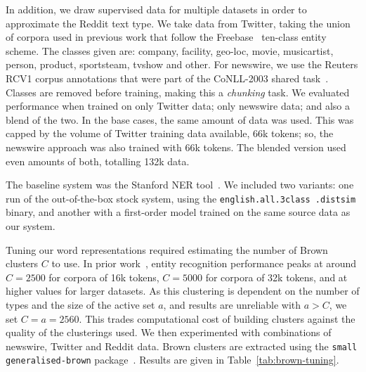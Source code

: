 \documentclass[acmsmall]{acmart}
\begin{document}
In addition, we draw supervised data for multiple datasets in order to approximate the Reddit text type.
We take data from Twitter, taking the union of corpora used in previous work that follow the Freebase~\cite{bollacker2008freebase} ten-class entity scheme.
The classes given are: company, facility, geo-loc, movie, musicartist, person, product, sportsteam, tvshow and other.
For newswire, we use the Reuters RCV1 corpus annotations that were part of the CoNLL-2003 shared task~\cite{tjong2003introduction}.
Classes are removed before training, making this a \emph{chunking} task.
We evaluated performance when trained on only Twitter data; only newswire data; and also a blend of the two.
In the base cases, the same amount of data was used.
This was capped by the volume of Twitter training data available, 66k tokens; so, the newswire approach was also trained with 66k tokens.
The blended version used even amounts of both, totalling 132k data.

The baseline system was the Stanford NER tool~\cite{finkel2005incorporating}.
We included two variants: one run of the out-of-the-box stock system, using the {\tt \small english.all.3class .distsim} binary, and another with a first-order model trained on the same source data as our system.

Tuning our word representations required estimating the number of Brown clusters $C$ to use.
In prior work~\cite{derczynski2015tune}, entity recognition performance %
peaks at around $C=2500$ for corpora of 16k tokens, $C=5000$ for corpora of 32k tokens, and at higher values for larger datasets.
As this clustering is dependent on the number of types and the size of the active set $a$, and results are unreliable with $a>C$, we set $C = a = 2560$.
This trades computational cost of building clusters against the quality of the clusterings used.
We then experimented with combinations of newswire, Twitter and Reddit data.
Brown clusters are extracted using the {\tt small generalised-brown} package~\cite{sean_chester_2015_33758}.
Results are given in Table~\ref{tab:brown-tuning}.
\end{document}
